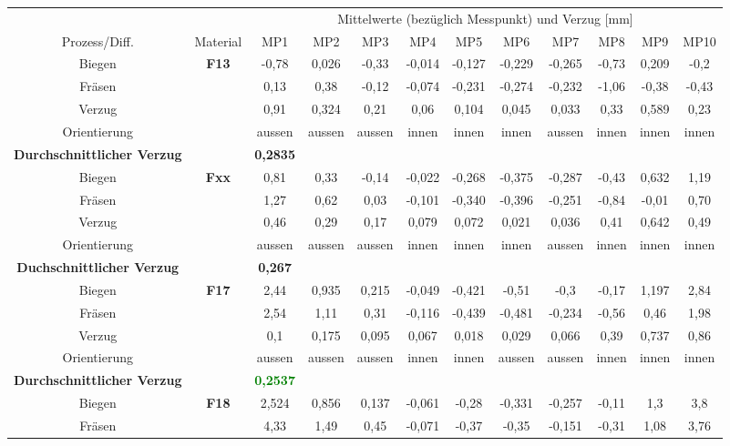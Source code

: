 \documentclass[12pt,a4paper,parskip]{scrartcl}
\begin{document}
\begin{table}
\begin{tabular}{cccccccccccc}
\toprule
&& \multicolumn{10}{c}{Mittelwerte (bezüglich Messpunkt) und Verzug [\si{\milli\meter}]} \\
\cmidrule(2){3-12}
Prozess/Diff. & Material & MP1 & MP2 & MP3 & MP4 & MP5 & MP6 & MP7 & MP8 & MP9 & MP10 \\
\midrule
Biegen & \textbf{F13} & -0,78 & 0,026 & -0,33 & -0,014 & -0,127 & -0,229 & -0,265 & -0,73 & 0,209 & -0,2 \\
Fräsen && 0,13 & 0,38 & -0,12 & -0,074 & -0,231 & -0,274 & -0,232 & -1,06 & -0,38 & -0,43 \\
Verzug && 0,91 & 0,324 & 0,21 & 0,06 & 0,104 & 0,045 & 0,033 & 0,33 & 0,589 & 0,23 \\
Orientierung && aussen & aussen & aussen & innen & innen & innen & aussen & innen & innen & innen \\
\textbf{Durchschnittlicher Verzug} &&\textbf{0,2835}&&&&&&&&&\\
\midrule
Biegen & \textbf{Fxx} & 0,81 & 0,33 & -0,14 & -0,022 & -0,268 & -0,375 & -0,287 & -0,43 & 0,632 & 1,19\\
Fräsen && 1,27 & 0,62 & 0,03 & -0,101 & -0,340 & -0,396 & -0,251 & -0,84 & -0,01 & 0,70 \\
Verzug && 0,46 & 0,29 & 0,17 & 0,079 & 0,072 & 0,021 & 0,036 & 0,41 & 0,642 & 0,49 \\
Orientierung && aussen & aussen & aussen & innen & innen & innen & aussen & innen & innen & innen \\
\textbf{Duchschnittlicher Verzug} && \textbf{0,267}&&&&&&&&&\\
\midrule
Biegen & \textbf{F17} & 2,44 & 0,935 & 0,215 & -0,049 & -0,421 & -0,51 & -0,3 & -0,17 & 1,197 & 2,84 \\
Fräsen && 2,54 & 1,11 & 0,31 & -0,116 & -0,439  & -0,481  & -0,234  & -0,56 & 0,46 & 1,98  \\
Verzug && 0,1 & 0,175 & 0,095 & 0,067 & 0,018 & 0,029 &  0,066 & 0,39 & 0,737 & 0,86 \\
Orientierung && aussen & aussen & aussen & innen & innen & aussen & aussen & innen & innen & innen \\
\textbf{Durchschnittlicher Verzug} && \textbf{\textcolor{green}{0,2537}} &&&&&&&&&\\
\midrule
Biegen & \textbf{F18} & 2,524 & 0,856 & 0,137 & -0,061 & -0,28 & -0,331 & -0,257 & -0,11 & 1,3 & 3,8 \\
Fräsen && 4,33 & 1,49 & 0,45 & -0,071 & -0,37 & -0,35 & -0,151 & -0,31 & 1,08 & 3,76 \\

\end{tabular}
\end{table}
\end{document}
